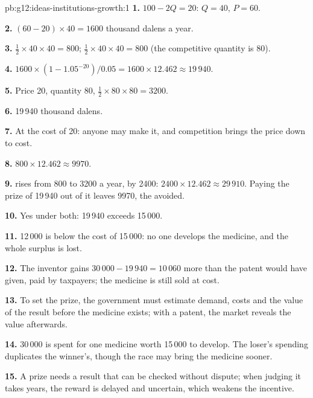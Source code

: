 \begin{solution}{pb:g12:ideas-institutions-growth:1}
\textbf{1.}  $100 - 2Q = 20$: $Q = 40$, $P = 60$.

\textbf{2.} $(60 - 20) \times 40 = 1600$ thousand dalens a year.

\textbf{3.}  $\tfrac12 \times 40 \times 40 = 800$;  $\tfrac12 \times 40 \times 40 = 800$ (the competitive quantity is 80).

\textbf{4.} $1600 \times (1 - 1.05^{-20})/0.05 = 1600 \times 12.462 \approx 19\,940$.

\textbf{5.} Price 20, quantity 80,  $\tfrac12 \times 80 \times 80 = 3200$.

\textbf{6.} 19\,940 thousand dalens.

\textbf{7.} At the cost of 20: anyone may make it, and competition brings the price down to cost.

\textbf{8.} $800 \times 12.462 \approx 9970$.

\textbf{9.}  rises from 800 to 3200 a year, by 2400: $2400 \times 12.462 \approx 29\,910$. Paying the prize of 19\,940 out of it leaves 9970, the  avoided.

\textbf{10.} Yes under both: 19\,940 exceeds 15\,000.

\textbf{11.} 12\,000 is below the cost of 15\,000: no one develops the medicine, and the whole surplus is lost.

\textbf{12.} The inventor gains $30\,000 - 19\,940 = 10\,060$ more than the patent would have given, paid by taxpayers; the medicine is still sold at cost.

\textbf{13.} To set the prize, the government must estimate demand, costs and the value of the result before the medicine exists; with a patent, the market reveals the
value afterwards.

\textbf{14.} 30\,000 is spent for one medicine worth 15\,000 to develop. The loser's spending duplicates the winner's, though the race may bring the medicine sooner.

\textbf{15.} A prize needs a result that can be checked without dispute; when judging it takes years, the reward is delayed and uncertain, which weakens the incentive.


\end{solution}

